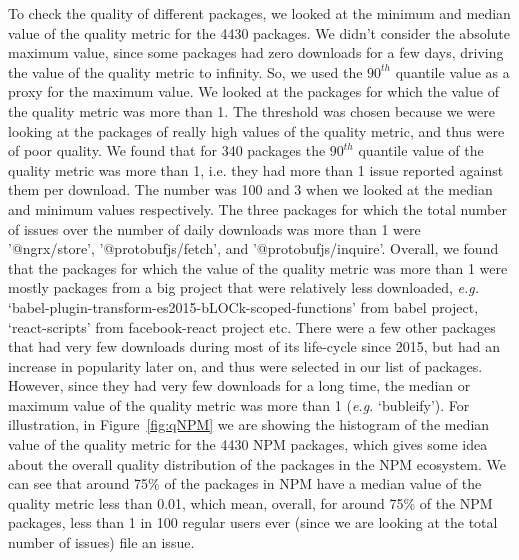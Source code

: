 \documentclass[smallcondensed]{svjour3}     %
\begin{document}
To check the quality of different packages, we looked at the minimum and median value of the quality metric for the 4430 packages. We didn't consider the absolute maximum value, since some packages had zero downloads for a few days, driving the value of the quality metric to infinity. So, we used the $90^{th}$ quantile value as a proxy for the maximum value. We looked at the packages for which the value of the quality metric was more than 1. The threshold was chosen because we were looking at the packages of really high values of the quality metric, and thus were of poor quality. We found that for 340 packages the $90^{th}$ quantile value of the quality metric was more than 1, i.e. they had more than 1 issue reported against them per download. The number was 100 and 3 when we looked at the median and minimum values respectively. The three packages for which the total number of issues over the number of daily downloads was more than 1 were '@ngrx/store', '@protobufjs/fetch', and '@protobufjs/inquire'. Overall, we found that the packages for which the value of the quality metric was more than 1 were mostly packages from a big project that were relatively less downloaded, \emph{e.g.} `babel-plugin-transform-es2015-bLOCk-scoped-functions' from babel project, `react-scripts' from facebook-react project etc. There were a few other packages that had very few downloads during most of its life-cycle since 2015, but had an increase in popularity later on, and thus were selected in our list of packages. However, since they had very few downloads for a long time, the median or maximum value of the quality metric was more than 1 (\emph{e.g.} `bubleify'). 
For illustration, in Figure~\ref{fig:qNPM} we are showing the histogram of the median value of the quality metric for the 4430 NPM packages, which gives some idea about the overall quality distribution of the packages in the NPM ecosystem. We can see that around 75\% of the packages in NPM have a median value of the quality metric less than 0.01, which mean, overall, for around 75\% of the NPM packages, less than 1 in 100 regular users ever (since we are looking at the total number of issues) file an issue.
\end{document}
